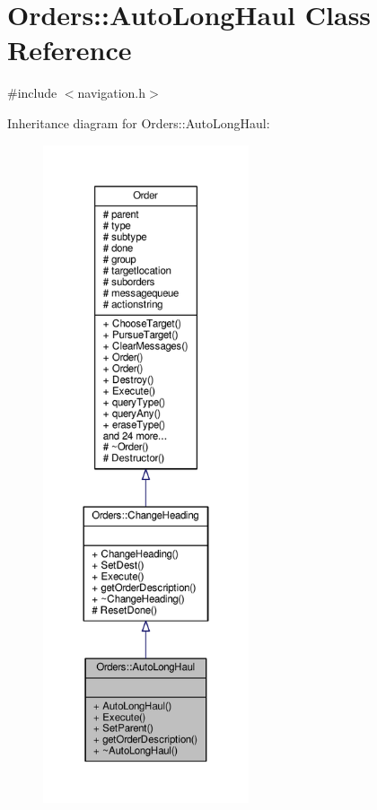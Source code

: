 \hypertarget{classOrders_1_1AutoLongHaul}{}\section{Orders\+:\+:Auto\+Long\+Haul Class Reference}
\label{classOrders_1_1AutoLongHaul}


{\ttfamily \#include $<$navigation.\+h$>$}



Inheritance diagram for Orders\+:\+:Auto\+Long\+Haul\+:
\nopagebreak
\begin{figure}[H]
\begin{center}
\leavevmode
\includegraphics[height=550pt]{d9/d8d/classOrders_1_1AutoLongHaul__inherit__graph}
\end{center}
\end{figure}


